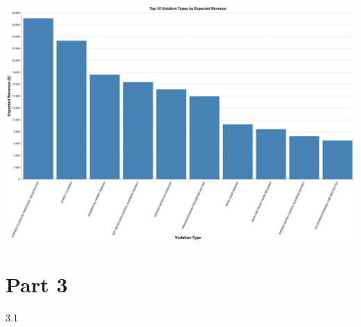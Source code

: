 \documentclass[
  letterpaper,
  DIV=11,
  numbers=noendperiod]{scrartcl}
\begin{document}
\includegraphics{ps2_answers_files/figure-pdf/cell-19-output-1.png}

\section{Part 3}\label{part-3}

3.1
\end{document}
